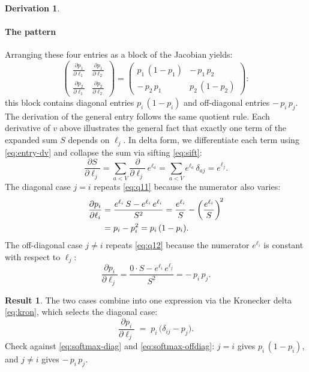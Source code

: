 \documentclass[letterpaper, 10 pt, conference]{ieeeconf}
\newcommand{\pdv}[2]{\frac{\partial #1}{\partial #2}}
\newcommand{\kron}[2]{\delta_{#1 #2}}
\theoremstyle{definition}
\newtheorem*{derivation}{Derivation}
\newtheorem*{result}{Result}
\begin{document}
\begin{derivation}
  \paragraph{The pattern}
  Arranging these four entries as a block of the Jacobian yields:
  \begin{equation}
    \begin{pmatrix}
      \pdv{p_1}{\ell_1} & \pdv{p_1}{\ell_2} \\[6pt]
      \pdv{p_2}{\ell_1} & \pdv{p_2}{\ell_2}
    \end{pmatrix}
    =
    \begin{pmatrix}
      p_1\,(1-p_1) & -\,p_1\,p_2  \\[2pt]
      -\,p_2\,p_1  & p_2\,(1-p_2)
    \end{pmatrix}:
    \label{eq:softmax-block}
  \end{equation}
  this block contains diagonal entries $p_i\,(1 - p_i)$ and off-diagonal entries $-\,p_i\,p_j$. The derivation of the general entry follows the same quotient rule. Each derivative of $v$ above illustrates the general fact that exactly one term of the expanded sum $S$ depends on $\ell_j$. In delta form, we differentiate each term using \eqref{eq:entry-dv} and collapse the sum via sifting \eqref{eq:sift}:
  \begin{equation}
    \pdv{S}{\ell_j}
    = \sum_{a<V} \pdv{}{\ell_j}\,e^{\ell_a}
    = \sum_{a<V} e^{\ell_a}\,\kron{a}{j}
    = e^{\ell_j}.
    \label{eq:softmax-dS}
  \end{equation}
  The diagonal case $j = i$ repeats \eqref{eq:q11} because the numerator also varies:
  \begin{align}
    \pdv{p_i}{\ell_i}
     & = \frac{e^{\ell_i}\,S - e^{\ell_i}\,e^{\ell_i}}{S^2}
    = \frac{e^{\ell_i}}{S}
    - \left(\frac{e^{\ell_i}}{S}\right)^{\!2} \notag        \\
     & = p_i - p_i^2 = p_i\,(1 - p_i).
    \label{eq:softmax-diag}
  \end{align}
  The off-diagonal case $j \neq i$ repeats \eqref{eq:q12} because the numerator $e^{\ell_i}$ is constant with respect to $\ell_j$:
  \begin{equation}
    \pdv{p_i}{\ell_j}
    = \frac{0 \cdot S - e^{\ell_i}\,e^{\ell_j}}{S^2}
    = -\,p_i\,p_j.
    \label{eq:softmax-offdiag}
  \end{equation}
\end{derivation}

\begin{result}
  The two cases combine into one expression via the Kronecker delta
  \eqref{eq:kron}, which selects the diagonal case:
  \begin{equation}
    \pdv{p_i}{\ell_j} \;=\; p_i\,\bigl(\kron{i}{j} - p_j\bigr).
    \label{eq:softmax-jac}
  \end{equation}
  Check against \eqref{eq:softmax-diag} and \eqref{eq:softmax-offdiag}:
  $j = i$ gives $p_i\,(1 - p_i)$, and $j \neq i$ gives $-\,p_i\,p_j$.
\end{result}
\end{document}

